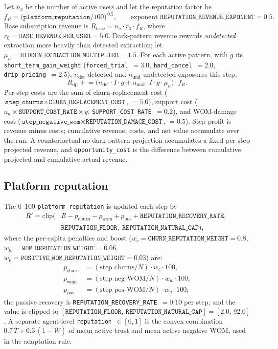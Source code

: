 \documentclass[11pt]{article}
\newcommand{\code}[1]{\texttt{#1}}
\begin{document}
Let $n_a$ be the number of active users and let the reputation factor be
\[
f_R = \big(\code{platform\_reputation}/100\big)^{\,0.5},
\qquad \text{exponent } \code{REPUTATION\_REVENUE\_EXPONENT} = 0.5 .
\]
Base subscription revenue is $R_{\text{base}} = n_a \cdot r_0 \cdot f_R$,
where $r_0 = \code{BASE\_REVENUE\_PER\_USER} = 5.0$.
Dark-pattern revenue rewards \emph{undetected} extraction more heavily than detected extraction; let $\mu_h = \code{HIDDEN\_EXTRACTION\_MULTIPLIER} = 1.5$.
For each active pattern, with $g$ its \code{short\_term\_gain\_weight}
(\code{forced\_trial}~$=3.0$, \code{hard\_cancel}~$=2.0$,
\code{drip\_pricing}~$=2.5$), $n_{\text{det}}$ detected and $n_{\text{und}}$
undetected exposures this step,
\[
R_{\text{dp}} \mathrel{+}= \Big(n_{\text{det}}\cdot I \cdot g
+ n_{\text{und}}\cdot I \cdot g \cdot \mu_h\Big)\cdot f_R.
\]
Per-step costs are the sum of churn-replacement cost
($\code{step\_churns}\times\code{CHURN\_REPLACEMENT\_COST}$, $=5.0$), support cost
($n_a\times\code{SUPPORT\_COST\_RATE}\times q$, \code{SUPPORT\_COST\_RATE}~$=0.2$),
and WOM-damage cost
($\code{step\_negative\_wom}\times\code{REPUTATION\_DAMAGE\_COST}$, $=0.5$).
Step profit is revenue minus costs; cumulative revenue, costs, and net value
accumulate over the run. A counterfactual no-dark-pattern projection accumulates a
fixed per-step projected revenue, and \code{opportunity\_cost} is the difference
between cumulative projected and cumulative actual revenue.

\subsection{Platform reputation}
\label{sub:reputation}

The $0$--$100$ \code{platform\_reputation} is updated each step by
\begin{align*}
R' = \mathrm{clip}\bigl(&R - p_{\text{churn}} - p_{\text{wom}} + p_{\text{pos}}
+ \code{REPUTATION\_RECOVERY\_RATE},\; \\
&\code{REPUTATION\_FLOOR},\; \code{REPUTATION\_NATURAL\_CAP}\bigr),
\end{align*}
where the per-capita penalties and boost ($w_c = \code{CHURN\_REPUTATION\_WEIGHT}=0.8$,
$w_w = \code{WOM\_REPUTATION\_WEIGHT}=0.06$,
$w_p = \code{POSITIVE\_WOM\_REPUTATION\_WEIGHT}=0.03$) are:
\begin{align*}
p_{\text{churn}} &= (\text{step churns}/N)\cdot w_c\cdot100, \\
p_{\text{wom}}   &= (\text{step neg-WOM}/N)\cdot w_w\cdot100, \\
p_{\text{pos}}   &= (\text{step pos-WOM}/N)\cdot w_p\cdot100;
\end{align*}
the passive recovery is \code{REPUTATION\_RECOVERY\_RATE}~$=0.10$ per
step; and the value is clipped to $[\code{REPUTATION\_FLOOR},\,
\code{REPUTATION\_NATURAL\_CAP}] = [2.0,\,92.0]$. A separate agent-level
\code{reputation}~$\in[0,1]$ is the convex combination
$0.7\,\overline{T} + 0.3\,(1 - \overline{W})$ of mean active trust and mean active
negative WOM, used in the adaptation rule.
\end{document}
